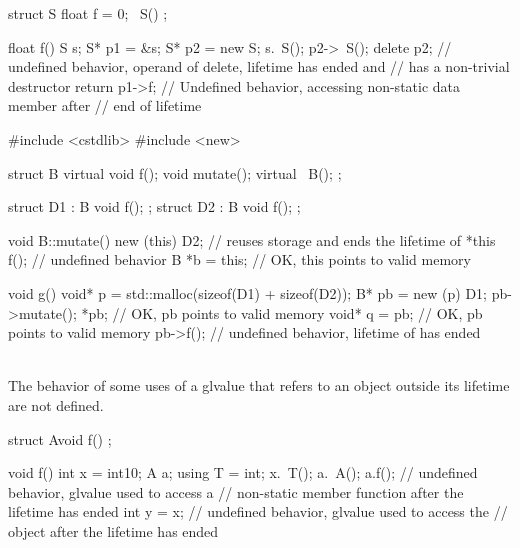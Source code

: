 \pnum
\begin{example}
\begin{codeblock}
struct S {
  float f = 0;
  ~S() {}
};

float f() {
  S s;
  S* p1 = &s;
  S* p2 = new S;
  s.~S();
  p2->~S();
  delete p2;            // undefined behavior, operand of delete, lifetime has ended and 
                        // has a non-trivial destructor
  return p1->f;         // Undefined behavior, accessing non-static data member after
                        // end of lifetime
}
\end{codeblock}
\end{example}
\begin{example}
\begin{codeblock}
#include <cstdlib>
#include <new>

struct B {
  virtual void f();
  void mutate();
  virtual ~B();
};

struct D1 : B {
  void f();
};
struct D2 : B {
  void f();
};

void B::mutate() {
  new (this) D2;        // reuses storage and ends the lifetime of *this
  f();                  // undefined behavior
  B *b = this;          // OK, this points to valid memory
}

void g() {
  void* p = std::malloc(sizeof(D1) + sizeof(D2));
  B* pb = new (p) D1;
  pb->mutate();
  *pb;                  // OK, pb points to valid memory
  void* q = pb;         // OK, pb points to valid memory
  pb->f();              // undefined behavior, lifetime of  has ended
}
\end{codeblock}
\end{example}

\pnum
{} \\
The behavior of some uses of a glvalue
that refers to an object outside its lifetime
are not defined.

\pnum
\begin{example}
\begin{codeblock}
struct A{void f(){} };

void f() {
  int x = int{10};
  A a;
  using T = int;
  x.~T();
  a.~A();
  a.f();        // undefined behavior, glvalue used to access a
                // non-static member function after the lifetime has ended
  int y = x;    // undefined behavior, glvalue used to access the
                // object after the lifetime has ended
}
\end{codeblock}
\end{example}


